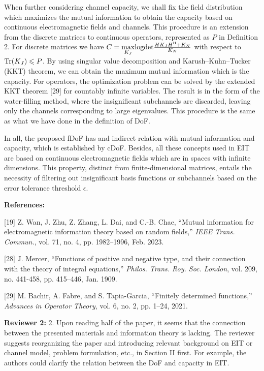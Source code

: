 \documentclass[a4paper,12pt]{article}
\begin{document}
\begin{framed}
{	\quad When further considering channel capacity, we shall fix the field distribution which maximizes the mutual information to obtain the capacity based on continuous electromagnetic fields and channels. This procedure is an extension from the discrete matrices to continuous operators, represented as $P$ in Definition 2. For discrete matrices we have $C = \underset{K_J}{\rm max}{\rm logdet}\frac{HK_JH^{\rm H}+K_N}{K_N}$ with respect to ${\rm Tr}(K_J) \leqslant P$. By using singular value decomposition and Karush–Kuhn–Tucker (KKT) theorem, we can obtain the maximum mutual information which is the capacity. For operators, the optimization problem can be solved by the extended KKT theorem [29] for countably infinite variables. The result is in the form of the water-filling method, where the insignificant subchannels are discarded, leaving only the channels corresponding to large eigenvalues. This procedure is the same as what we have done in the definition of DoF. 
	
	\quad In all, the proposed fDoF has and indirect relation with mutual information and capacity, which is established by cDoF. Besides, all these concepts used in EIT are based on continuous electromagnetic fields which are in spaces with infinite dimensions. This property, distinct from finite-dimensional matrices, entails the necessity of filtering out insignificant basis functions or subchannels based on the error tolerance threshold $\epsilon$. 
	
}

\end{framed}

{\color{blue}
	{\bf References:}
	
	[19] Z. Wan, J. Zhu, Z. Zhang, L. Dai, and C.-B. Chae, “Mutual information for electromagnetic information theory based on random fields,” {\it IEEE Trans. Commun.}, vol. 71, no. 4, pp. 1982–1996, Feb. 2023.
	
	[28] J. Mercer, “Functions of positive and negative type, and their connection with the theory of integral equations,” {\it Philos. Trans. Roy. Soc. London}, vol. 209, no. 441-458, pp. 415–446, Jan. 1909.
	
	[29] M. Bachir, A. Fabre, and S. Tapia-Garcia, “Finitely determined functions,” {\it Advances in Operator Theory}, vol. 6, no. 2, pp. 1–24, 2021.
}

\textbf{Reviewer 2:}
2. Upon reading half of the paper, it seems that the connection between the presented materials and information theory is lacking. The reviewer suggests reorganizing the paper and introducing relevant background on EIT or channel model, problem formulation, etc., in Section II first. For example, the authors could clarify the relation between the DoF and capacity in EIT.
\end{document}
